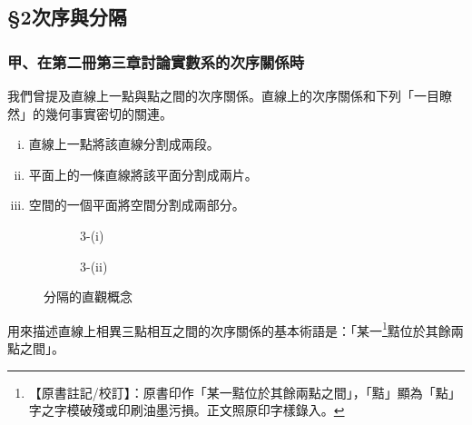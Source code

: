 \subsection*{\S 2\quad 次序與分隔}
\label{sec:b3_a1_2}

\subsubsection*{甲、在第二冊第三章討論實數系的次序關係時}

我們曾提及直線上一點與點之間的次序關係。直線上的次序關係和下列「一目瞭然」的幾何事實密切的關連。
\begin{enumerate}[(i), leftmargin=2.5em]
  \item 直線上一點將該直線分割成兩段。
  \item 平面上的一條直線將該平面分割成兩片。
  \item 空間的一個平面將空間分割成兩部分。
\end{enumerate}

\begin{figure}[H]
\centering
\begin{subfigure}[b]{0.45\textwidth}
\centering
{}
\caption{3-(i)}
\label{fig:b3-a1-3-1}
\end{subfigure}
\hfill
\begin{subfigure}[b]{0.45\textwidth}
\centering
{}
\caption{3-(ii)}
\label{fig:b3-a1-3-2}
\end{subfigure}
\caption{分隔的直觀概念}
\label{fig:b3-a1-3}
\end{figure}

用來描述直線上相異三點相互之間的次序關係的基本術語是：「某一\label{note:b3-a1-p263-point}\footnote{【原書註記/校訂】：原書印作「某一黠位於其餘兩點之間」，「黠」顯為「點」字之字模破殘或印刷油墨污損。正文照原印字樣錄入。}黠位於其餘兩點之間」。

